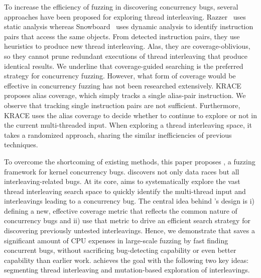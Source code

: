 To increase the efficiency of fuzzing in discovering concurrency bugs, several approaches
have been proposed for exploring thread interleaving. 
Razzer~\cite{razzer} uses static analysis whereas
Snowboard~\cite{snowboard} uses dynamic analysis
to identify instruction pairs that access the same objects.
From detected instruction pairs, they use heuristics 
to produce new thread interleaving. Alas, they are coverage-oblivious, 
so they cannot prune redundant executions of thread interleaving
that produce identical results. We underline that 
coverage-guided searching is the preferred strategy 
for concurrency fuzzing. However, what form of coverage would be 
effective in concurrency fuzzing has not been researched extensively.
KRACE~\cite{krace} proposes alias coverage, which simply tracks 
a single alias-pair instruction. We observe that tracking single 
instruction pairs are not sufficient. Furthermore, KRACE uses 
the alias coverage to decide whether to continue to explore or not 
in the current multi-threaded input. When exploring a thread 
interleaving space, it takes a randomized approach, 
sharing the similar inefficiencies of previous techniques.

To overcome the shortcoming of existing methods, this paper proposes
\sys, a fuzzing framework for kernel concurrency bugs. 
\sys discovers not only data races but 
all interleaving-related bugs. 
At its core, \sys aims to systematically explore the vast thread
interleaving search space to quickly identify the multi-thread input and 
interleavings leading to a concurrency bug. The central idea behind \sys's design
is i) defining a new, effective coverage metric that reflects the 
common nature of concurrency bugs and ii) use that metric to drive 
an efficient search strategy for discovering previously untested interleavings.
Hence, we demonstrate that \sys saves a significant amount of CPU expenses 
in large-scale fuzzing by fast finding concurrent bugs, 
without sacrificing bug-detecting capability or even better 
capability than earlier work.
\sys achieves the goal with the following two key ideas:
segmenting thread interleaving and mutation-based exploration of interleavings.

